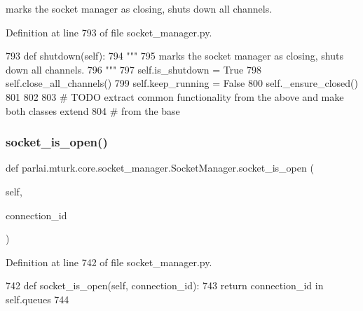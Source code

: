 \begin{DoxyVerb}marks the socket manager as closing, shuts down all channels.
\end{DoxyVerb}
 

Definition at line 793 of file socket\+\_\+manager.\+py.


\begin{DoxyCode}
793     \textcolor{keyword}{def }shutdown(self):
794         \textcolor{stringliteral}{"""}
795 \textcolor{stringliteral}{        marks the socket manager as closing, shuts down all channels.}
796 \textcolor{stringliteral}{        """}
797         self.is\_shutdown = \textcolor{keyword}{True}
798         self.close\_all\_channels()
799         self.keep\_running = \textcolor{keyword}{False}
800         self.\_ensure\_closed()
801 
802 
803 \textcolor{comment}{# TODO extract common functionality from the above and make both classes extend}
804 \textcolor{comment}{# from the base}
\end{DoxyCode}
\mbox{\label{classparlai_1_1mturk_1_1core_1_1socket__manager_1_1SocketManager_a895934ce725c0770e94ff6ba0842078e}} 
\subsubsection{\texorpdfstring{socket\+\_\+is\+\_\+open()}{socket\_is\_open()}}
{\footnotesize\ttfamily def parlai.\+mturk.\+core.\+socket\+\_\+manager.\+Socket\+Manager.\+socket\+\_\+is\+\_\+open (\begin{DoxyParamCaption}\item[{}]{self,  }\item[{}]{connection\+\_\+id }\end{DoxyParamCaption})}



Definition at line 742 of file socket\+\_\+manager.\+py.


\begin{DoxyCode}
742     \textcolor{keyword}{def }socket\_is\_open(self, connection\_id):
743         \textcolor{keywordflow}{return} connection\_id \textcolor{keywordflow}{in} self.queues
744 
\end{DoxyCode}


